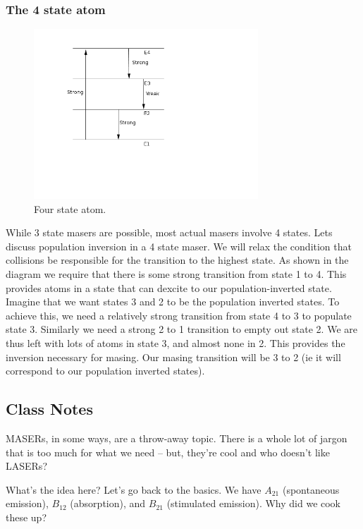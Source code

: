 \documentclass{article}
\def\ato{{A_{21}}}
\def\bto{{B_{21}}}
\def\bot{{B_{12}}}
\def\ato{{A_{21}}}
\def\bto{{B_{21}}}
\def\bot{{B_{12}}}
\def\ato{{A_{21}}}
\def\bto{{B_{21}}}
\def\bot{{B_{12}}}
\begin{document}
\subsubsection{The 4 state atom}

\begin{figure}
    \centering
    \includegraphics[width=0.75\textwidth]{figures/4state.png}
    \caption{Four state atom.}
    \label{fig:4state}
\end{figure}

While 3 state masers are possible, most actual masers involve 4 states. Lets discuss population inversion in a 4 state maser. We will relax the condition that collisions
be responsible for the transition to the highest state. As shown in the diagram we require that there is some strong transition from state 1 to 4. This provides atoms in a state that can dexcite to our population-inverted state. Imagine that we want states 3 and 2 to be the population inverted states. To achieve this, we need a relatively strong transition from state 4 to 3 to populate state 3. Similarly we need a strong 2 to 1 transition to empty out state 2. We are thus left with lots of atoms in state 3, and almost none in 2. This provides the inversion necessary for masing. Our masing transition will be 3 to 2 (ie it will correspond to our population inverted states).

\subsection{Class Notes}

MASERs, in some ways, are a throw-away topic. There is a whole lot of jargon that is too much for what we need -- but, they're cool and who doesn't like LASERs? 

What's the idea here? Let's go back to the basics. We have $\ato$ (spontaneous emission), $\bot$ (absorption), and $\bto$ (stimulated emission). Why did we cook these up? 
\end{document}
